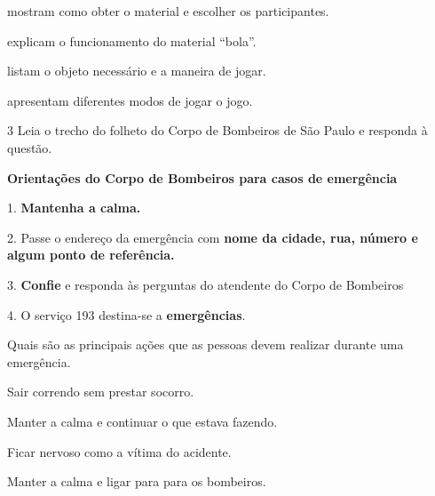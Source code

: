 \begin{conteudo}
\begin{conteudo}
\begin{conteudo}
\begin{conteudo}
\begin{escolha}
\item mostram como obter o material e escolher os participantes.

\item explicam o funcionamento do material ``bola''.

\item listam o objeto necessário e a maneira de jogar.

\item apresentam diferentes modos de jogar o jogo.
\end{escolha}

\num{3} Leia o trecho do folheto do Corpo de Bombeiros de São Paulo e responda à questão.
\begin{myquote}
\textbf{Orientações do Corpo de Bombeiros para casos de emergência}

1. \textbf{Mantenha a calma.}

2. Passe o endereço da emergência com \textbf{nome da cidade, rua, número e algum ponto de referência.}

3. \textbf{Confie} e responda às perguntas do atendente do Corpo de Bombeiros

4. O serviço 193 destina-se a \textbf{emergências}.

\end{myquote}

Quais são as principais ações que as pessoas devem realizar durante uma emergência. 

\begin{escolha}
\item Sair correndo sem prestar socorro.

\item Manter a calma e continuar o que estava fazendo.

\item Ficar nervoso como a vítima do acidente.

\item Manter a calma e ligar para para os bombeiros.
\end{escolha}

\end{conteudo}
\end{conteudo}
\end{conteudo}
\end{conteudo}
